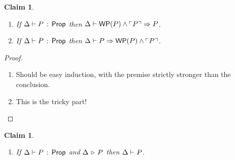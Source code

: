 \documentclass[10pt,letter]{article}
\newtheorem{claim}[theorem]{Claim}
\begin{document}
\begin{claim}
\mbox{}
\begin{enumerate}
  \item If $\Delta \vdash P\, :\, \mathsf{Prop}$ then
    $\Delta \vdash \mathop{\mathsf{WP}}(P) \wedge \ulcorner P \urcorner \Rightarrow P$.
  \item If $\Delta \vdash P\, :\, \mathsf{Prop}$ then
    $\Delta \vdash P \Rightarrow \mathop{\mathsf{WP}}(P) \wedge \ulcorner P \urcorner$.
\end{enumerate}
\end{claim}

\begin{proof}
  \begin{enumerate}
  \item Should be easy induction, with the premise strictly stronger
    than the conclusion.
  \item This is the tricky part!
  \end{enumerate}
\end{proof}

\begin{claim}
\mbox{}
\begin{enumerate}
  \item If $\Delta \vdash P\, :\, \mathsf{Prop}$ and $\Delta \,\triangleright\, P$ then
    $\Delta \vdash P$.
\end{enumerate}
\end{claim}
\end{document}
